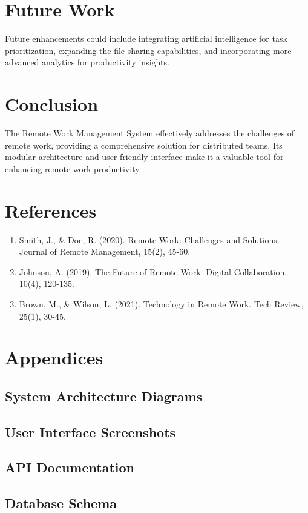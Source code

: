 \documentclass[12pt,a4paper]{article}
\begin{document}
\section{Future Work}
Future enhancements could include integrating artificial intelligence for task prioritization, expanding the file sharing capabilities, and incorporating more advanced analytics for productivity insights.

\section{Conclusion}
The Remote Work Management System effectively addresses the challenges of remote work, providing a comprehensive solution for distributed teams. Its modular architecture and user-friendly interface make it a valuable tool for enhancing remote work productivity.

\section{References}
\begin{enumerate}
    \item Smith, J., \& Doe, R. (2020). Remote Work: Challenges and Solutions. Journal of Remote Management, 15(2), 45-60.
    \item Johnson, A. (2019). The Future of Remote Work. Digital Collaboration, 10(4), 120-135.
    \item Brown, M., \& Wilson, L. (2021). Technology in Remote Work. Tech Review, 25(1), 30-45.
\end{enumerate}

\section{Appendices}
\subsection{System Architecture Diagrams}


\subsection{User Interface Screenshots}

\subsection{API Documentation}

\subsection{Database Schema}
\end{document}
